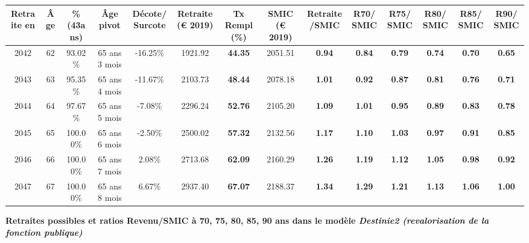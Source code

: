 \begin{adjustbox}{max width=\textwidth} 
\begin{tabular}[htb]{|c|c||c|c|c||c|c||c|c||c|c|c|c|c|} 
\hline 
 Retraite en &  Âge &  \%(43ans) &  Âge pivot &  Décote/Surcote &  Retraite (\euro{} 2019) &  Tx Rempl(\%) &  SMIC (\euro{} 2019) &  Retraite/SMIC &  R70/SMIC &  R75/SMIC &  R80/SMIC &  R85/SMIC &  R90/SMIC \\ 
\hline \hline 
 2042 &  62 &  93.02\% &  65 ans 3 mois &  -16.25\% &  1921.92 &  {\bf 44.35} &  2051.51 &  {\bf {\color{red} 0.94}} &  {\bf {\color{red} 0.84}} &  {\bf {\color{red} 0.79}} &  {\bf {\color{red} 0.74}} &  {\bf {\color{red} 0.70}} &  {\bf {\color{red} 0.65}} \\ 
\hline 
 2043 &  63 &  95.35\% &  65 ans 4 mois &  -11.67\% &  2103.73 &  {\bf 48.44} &  2078.18 &  {\bf 1.01} &  {\bf {\color{red} 0.92}} &  {\bf {\color{red} 0.87}} &  {\bf {\color{red} 0.81}} &  {\bf {\color{red} 0.76}} &  {\bf {\color{red} 0.71}} \\ 
\hline 
 2044 &  64 &  97.67\% &  65 ans 5 mois &  -7.08\% &  2296.24 &  {\bf 52.76} &  2105.20 &  {\bf 1.09} &  {\bf 1.01} &  {\bf {\color{red} 0.95}} &  {\bf {\color{red} 0.89}} &  {\bf {\color{red} 0.83}} &  {\bf {\color{red} 0.78}} \\ 
\hline 
 2045 &  65 &  100.00\% &  65 ans 6 mois &  -2.50\% &  2500.02 &  {\bf 57.32} &  2132.56 &  {\bf 1.17} &  {\bf 1.10} &  {\bf 1.03} &  {\bf {\color{red} 0.97}} &  {\bf {\color{red} 0.91}} &  {\bf {\color{red} 0.85}} \\ 
\hline 
 2046 &  66 &  100.00\% &  65 ans 7 mois &  2.08\% &  2713.68 &  {\bf 62.09} &  2160.29 &  {\bf 1.26} &  {\bf 1.19} &  {\bf 1.12} &  {\bf 1.05} &  {\bf {\color{red} 0.98}} &  {\bf {\color{red} 0.92}} \\ 
\hline 
 2047 &  67 &  100.00\% &  65 ans 8 mois &  6.67\% &  2937.40 &  {\bf 67.07} &  2188.37 &  {\bf 1.34} &  {\bf 1.29} &  {\bf 1.21} &  {\bf 1.13} &  {\bf 1.06} &  {\bf {\color{red} 1.00}} \\ 
\hline 
\hline 
\end{tabular} 
\end{adjustbox} 
 
 \vspace{0.1cm} 
{\bf \noindent Retraites possibles et ratios Revenu/SMIC à 70, 75, 80, 85, 90 ans dans le modèle \emph{Destinie2 (revalorisation de la fonction publique)}}  
 
